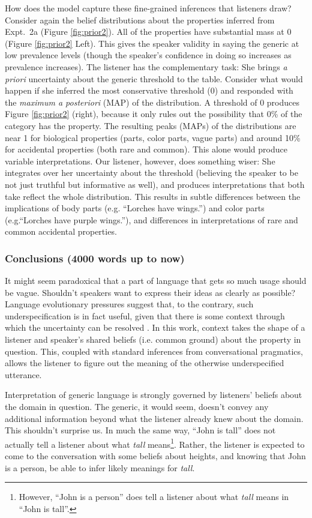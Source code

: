 \documentclass[10pt,letterpaper]{article}
\begin{document}
How does the model capture these fine-grained inferences that listeners draw?
Consider again the belief distributions about the properties inferred from Expt.~2a (Figure \ref{fig:prior2}). 
All of the properties have substantial mass at 0 (Figure \ref{fig:prior2} Left). 
This gives the speaker validity in saying the generic at low prevalence levels (though the speaker's confidence in doing so increases as prevalence increases).
The listener has the complementary task: She brings \emph{a priori} uncertainty about the generic threshold to the table.
Consider what would happen if she inferred the most conservative threshold (0) and responded with the \emph{maximum a posteriori} (MAP) of the distribution. 
A threshold of 0 produces Figure \ref{fig:prior2} (right), because it only rules out the possibility that 0\% of the category has the property. 
The resulting peaks (MAPs) of the distributions are near 1 for biological properties (parts, color parts, vague parts) and around 10\% for accidental properties (both rare and common). This alone would produce variable interpretations. 
Our listener, however, does something wiser: She integrates over her uncertainty about the threshold (believing the speaker to be not just truthful but informative as well), and produces interpretations that both take reflect the whole distribution.
This results in subtle differences between the implications of body parts (e.g. ``Lorches have wings.'') and  color parts (e.g.``Lorches have purple wings.''), and differences in interpretations of rare and common accidental properties. 


\subsubsection{Conclusions (4000 words up to now)}

It might seem paradoxical that a part of language that gets so much usage should be vague. 
Shouldn't speakers want to express their ideas as clearly as possible?
Language evolutionary pressures suggest that, to the contrary, such underspecification is in fact useful, given that there is some context through which the uncertainty can be resolved \cite{Piantadosi2012}.
In this work, context takes the shape of a listener and speaker's shared beliefs (i.e. common ground) about the property in question. 
This, coupled with standard inferences from conversational pragmatics, allows the listener to figure out the meaning of the otherwise underspecified utterance.

Interpretation of generic language is strongly governed by listeners' beliefs about the domain in question. 
The generic, it would seem, doesn't convey any additional information beyond what the listener already knew about the domain.
This shouldn't surprise us. 
In much the same way, ``John is tall'' does not actually tell a listener about what \emph{tall} means\footnote{However, ``John is a person'' does tell a listener about what \emph{tall} means in ``John is tall''.}. 
Rather, the listener is expected to come to the conversation with some beliefs about heights, and knowing that John is a person, be able to infer likely meanings for \emph{tall}.
\end{document}
